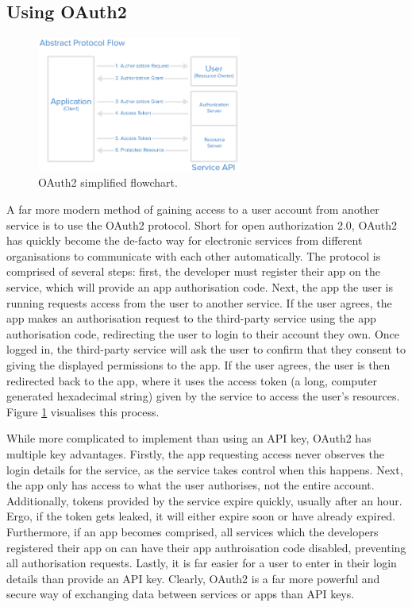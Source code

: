 \documentclass[11pt]{article}
\begin{document}
\subsection{Using OAuth2}

\begin{figure}[b!]
    \centering
    \includegraphics[width=0.6\textwidth]{figures/oauth_abstract_flow.png}
    \caption{OAuth2 simplified flowchart.}
    \label{fig:oauth-flowchart}
\end{figure}

A far more modern method of gaining access to a user account from another service is to use the OAuth2 protocol. Short for open authorization 2.0, OAuth2 has quickly become the de-facto way for electronic services from different organisations to communicate with each other automatically. The protocol is comprised of several steps: first, the developer must register their app on the service, which will provide an app authorisation code. Next, the app the user is running requests access from the user to another service. If the user agrees, the app makes an authorisation request to the third-party service using the app authorisation code, redirecting the user to login to their account they own. Once logged in, the third-party service will ask the user to confirm that they consent to giving the displayed permissions to the app. If the user agrees, the user is then redirected back to the app, where it uses the access token (a long, computer generated hexadecimal string) given by the service to access the user's resources. Figure \ref{fig:oauth-flowchart} visualises this process.

While more complicated to implement than using an API key, OAuth2 has multiple key advantages. Firstly, the app requesting access never observes the login details for the service, as the service takes control when this happens. Next, the app only has access to what the user authorises, not the entire account. Additionally, tokens provided by the service expire quickly, usually after an hour. Ergo, if the token gets leaked, it will either expire soon or have already expired. Furthermore, if an app becomes comprised, all services which the developers registered their app on can have their app authroisation code disabled, preventing all authorisation requests. Lastly, it is far easier for a user to enter in their login details than provide an API key. Clearly, OAuth2 is a far more powerful and secure way of exchanging data between services or apps than API keys.
\end{document}
